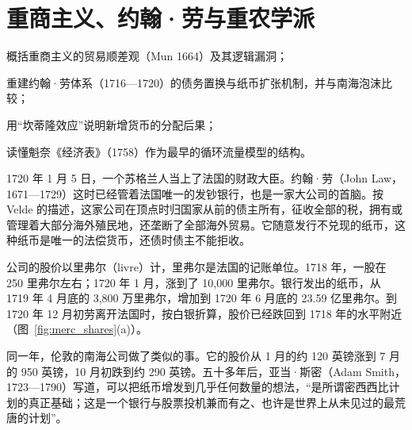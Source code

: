 \chapter{重商主义、约翰·劳与重农学派}\label{ch:mercantilism}

\begin{chapterguide}
\begin{guidegoals}
\item 概括重商主义的贸易顺差观（Mun 1664）及其逻辑漏洞；
\item 重建约翰·劳体系（1716—1720）的债务置换与纸币扩张机制，并与南海泡沫比较；
\item 用“坎蒂隆效应”说明新增货币的分配后果；
\item 读懂魁奈《经济表》（1758）作为最早的循环流量模型的结构。
\end{guidegoals}
\end{chapterguide}

1720 年 1 月 5 日，一个苏格兰人当上了法国的财政大臣。约翰·劳（John Law，1671—1729）这时已经管着法国唯一的发钞银行，也是一家大公司的首脑。按 Velde 的描述，这家公司在顶点时归国家从前的债主所有，征收全部的税，拥有或管理着大部分海外殖民地，还垄断了全部海外贸易。它随意发行不兑现的纸币，这种纸币是唯一的法偿货币，还债时债主不能拒收\cite{velde2003}。

公司的股价以里弗尔（livre）计，里弗尔是法国的记账单位。1718 年，一股在 250 里弗尔左右；1720 年 1 月，涨到了 10,000 里弗尔。银行发出的纸币，从 1719 年 4 月底的 3,800 万里弗尔，增加到 1720 年 6 月底的 23.59 亿里弗尔\cite{velde2003}。到 1720 年 12 月初劳离开法国时，按白银折算，股价已经跌回到 1718 年的水平附近（图~\ref{fig:merc_shares}(a)）。

同一年，伦敦的南海公司做了类似的事。它的股价从 1 月的约 120 英镑涨到 7 月的 950 英镑，10 月初跌到约 290 英镑\cite{garber1990}。五十多年后，亚当·斯密（Adam Smith，1723—1790）写道，可以把纸币增发到几乎任何数量的想法，“是所谓密西西比计划的真正基础；这是一个银行与股票投机兼而有之、也许是世界上从未见过的最荒唐的计划”\cite{smith1776}。

